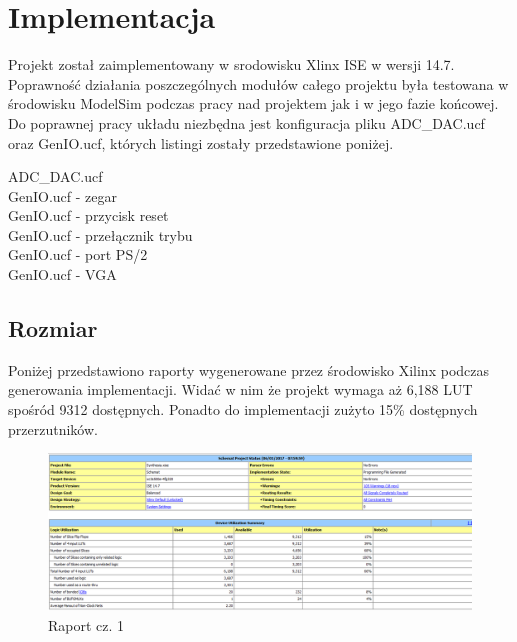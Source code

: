 \documentclass[a4paper]{report}
\begin{document}
\chapter{Implementacja}
	Projekt został zaimplementowany w srodowisku Xlinx ISE w wersji 14.7. Poprawność działania poszczególnych
	modułów całego projektu była testowana w środowisku ModelSim podczas pracy nad projektem jak i w jego fazie końcowej.
	Do poprawnej pracy układu niezbędna jest konfiguracja pliku ADC\_DAC.ucf oraz GenIO.ucf, których listingi zostały przedstawione
	poniżej.
	
	ADC\_DAC.ucf \\
	
	
	GenIO.ucf - zegar \\
	
	
	GenIO.ucf - przycisk reset \\
	
	
	GenIO.ucf - przełącznik trybu \\
	
	
	GenIO.ucf - port PS/2 \\
	
	
	GenIO.ucf - VGA \\
	

	\section{Rozmiar}
	
	Poniżej przedstawiono raporty wygenerowane przez środowisko Xilinx podczas generowania implementacji.
	Widać w nim że projekt wymaga aż 6,188 LUT spośród 9312 dostępnych. Ponadto do implementacji
	zużyto 15\%  dostępnych przerzutników.
	
	\begin{figure}[h!]
				\centering
				\includegraphics[width=1.0\textwidth]{report1.png}
				\caption{Raport cz. 1}
	\end{figure}	
	
\end{document}
